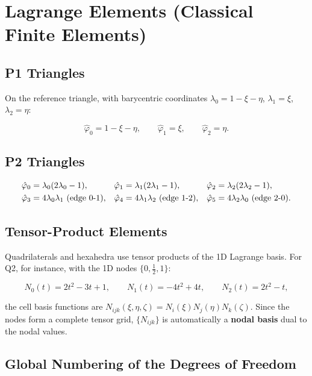 \documentclass[11pt,oneside]{book}
\theoremstyle{definition}
\theoremstyle{plain}
\begin{document}
\section{Lagrange Elements (Classical Finite Elements)}

\subsection{P1 Triangles}

On the reference triangle, with barycentric coordinates
$\lambda_0=1-\xi-\eta$, $\lambda_1=\xi$, $\lambda_2=\eta$:

\begin{equation}
\hat\varphi_0=1-\xi-\eta,\qquad
\hat\varphi_1=\xi,\qquad
\hat\varphi_2=\eta .
\label{eq:p1}
\end{equation}

\subsection{P2 Triangles}

\begin{align}
\hat\varphi_0&=\lambda_0(2\lambda_0-1),&
\hat\varphi_1&=\lambda_1(2\lambda_1-1),&
\hat\varphi_2&=\lambda_2(2\lambda_2-1),\notag\\
\hat\varphi_3&=4\lambda_0\lambda_1\ (\text{edge }0\text{-}1),&
\hat\varphi_4&=4\lambda_1\lambda_2\ (\text{edge }1\text{-}2),&
\hat\varphi_5&=4\lambda_2\lambda_0\ (\text{edge }2\text{-}0).
\label{eq:p2}
\end{align}

\subsection{Tensor-Product Elements}

Quadrilaterals and hexahedra use tensor products of the 1D Lagrange basis. For Q2,
for instance, with the 1D nodes $\{0,\tfrac12,1\}$:

\begin{equation}
N_0(t)=2t^2-3t+1,\qquad
N_1(t)=-4t^2+4t,\qquad
N_2(t)=2t^2-t,
\label{eq:q2-1d}
\end{equation}

the cell basis functions are $N_{ijk}(\xi,\eta,\zeta)=N_i(\xi)N_j(\eta)N_k(\zeta)$.
Since the nodes form a complete tensor grid, $\{N_{ijk}\}$ is automatically a
\textbf{nodal basis} dual to the nodal values.

\subsection{Global Numbering of the Degrees of Freedom}
\end{document}
